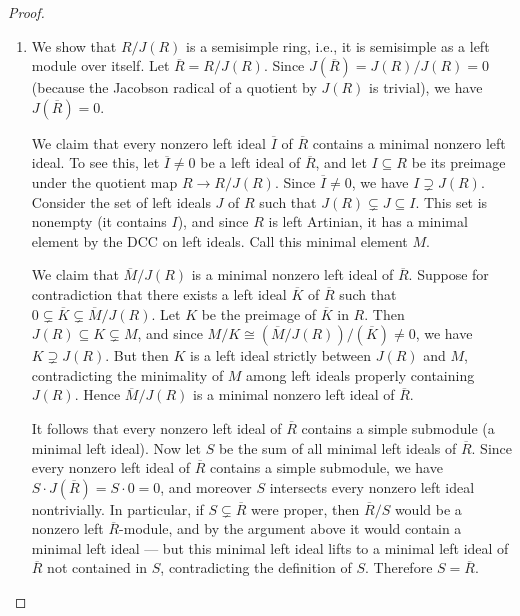 \begin{proof}
\begin{enumerate}
        Therefore, our assumption that $J(R)^n \neq 0$ was false. Hence $J(R)^n = \{0\}$ for some positive integer $n$, so $J(R)$ is a nilpotent ideal by .

        \item We show that $R/J(R)$ is a semisimple ring, i.e., it is semisimple as a left module over itself. Let $\overline{R} = R/J(R)$. Since $J(\overline{R}) = J(R)/J(R) = 0$ (because the Jacobson radical of a quotient by $J(R)$ is trivial), we have $J(\overline{R}) = 0$.

        We claim that every nonzero left ideal $\overline{I}$ of $\overline{R}$ contains a minimal nonzero left ideal. To see this, let $\overline{I} \neq 0$ be a left ideal of $\overline{R}$, and let $I \subseteq R$ be its preimage under the quotient map $R \to R/J(R)$. Since $\overline{I} \neq 0$, we have $I \supsetneq J(R)$. Consider the set of left ideals $J$ of $R$ such that $J(R) \subsetneq J \subseteq I$. This set is nonempty (it contains $I$), and since $R$ is left Artinian, it has a minimal element by the DCC on left ideals. Call this minimal element $M$.

        We claim that $\overline{M}/J(R)$ is a minimal nonzero left ideal of $\overline{R}$. Suppose for contradiction that there exists a left ideal $\overline{K}$ of $\overline{R}$ such that $0 \subsetneq \overline{K} \subsetneq \overline{M}/J(R)$. Let $K$ be the preimage of $\overline{K}$ in $R$. Then $J(R) \subseteq K \subsetneq M$, and since $M/K \cong (\overline{M}/J(R))/(\overline{K}) \neq 0$, we have $K \supsetneq J(R)$. But then $K$ is a left ideal strictly between $J(R)$ and $M$, contradicting the minimality of $M$ among left ideals properly containing $J(R)$. Hence $\overline{M}/J(R)$ is a minimal nonzero left ideal of $\overline{R}$.

        It follows that every nonzero left ideal of $\overline{R}$ contains a simple submodule (a minimal left ideal). Now let $S$ be the sum of all minimal left ideals of $\overline{R}$. Since every nonzero left ideal of $\overline{R}$ contains a simple submodule, we have $S \cdot J(\overline{R}) = S \cdot 0 = 0$, and moreover $S$ intersects every nonzero left ideal nontrivially. In particular, if $S \subsetneq \overline{R}$ were proper, then $\overline{R}/S$ would be a nonzero left $\overline{R}$-module, and by the argument above it would contain a minimal left ideal — but this minimal left ideal lifts to a minimal left ideal of $\overline{R}$ not contained in $S$, contradicting the definition of $S$. Therefore $S = \overline{R}$.


\end{enumerate}
\end{proof}
